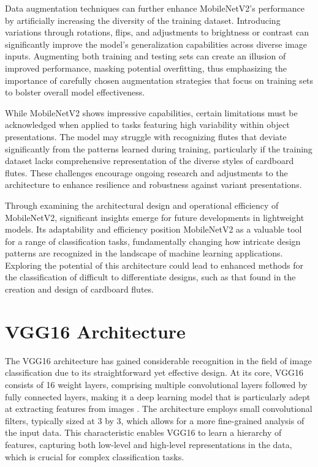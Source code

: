 Data augmentation techniques can further enhance MobileNetV2's performance by artificially increasing the diversity of the training dataset. Introducing variations through rotations, flips, and adjustments to brightness or contrast can significantly improve the model's generalization capabilities across diverse image inputs. Augmenting both training and testing sets can create an illusion of improved performance, masking potential overfitting, thus emphasizing the importance of carefully chosen augmentation strategies that focus on training sets to bolster overall model effectiveness. \cite{patel2022advancements}


While MobileNetV2 shows impressive capabilities, certain limitations must be acknowledged when applied to tasks featuring high variability within object presentations. The model may struggle with recognizing flutes that deviate significantly from the patterns learned during training, particularly if the training dataset lacks comprehensive representation of the diverse styles of cardboard flutes. These challenges encourage ongoing research and adjustments to the architecture to enhance resilience and robustness against variant presentations.


Through examining the architectural design and operational efficiency of MobileNetV2, significant insights emerge for future developments in lightweight models. Its adaptability and efficiency position MobileNetV2 as a valuable tool for a range of classification tasks, fundamentally changing how intricate design patterns are recognized in the landscape of machine learning applications. Exploring the potential of this architecture could lead to enhanced methods for the classification of difficult to differentiate designs, such as that found in the creation and design of cardboard flutes.

\section{VGG16 Architecture}

The VGG16 architecture has gained considerable recognition in the field of image classification due to its straightforward yet effective design. At its core, VGG16 consists of 16 weight layers, comprising multiple convolutional layers followed by fully connected layers, making it a deep learning model that is particularly adept at extracting features from images \cite{Simonyan2015}. The architecture employs small convolutional filters, typically sized at 3 by 3, which allows for a more fine-grained analysis of the input data. This characteristic enables VGG16 to learn a hierarchy of features, capturing both low-level and high-level representations in the data, which is crucial for complex classification tasks.



